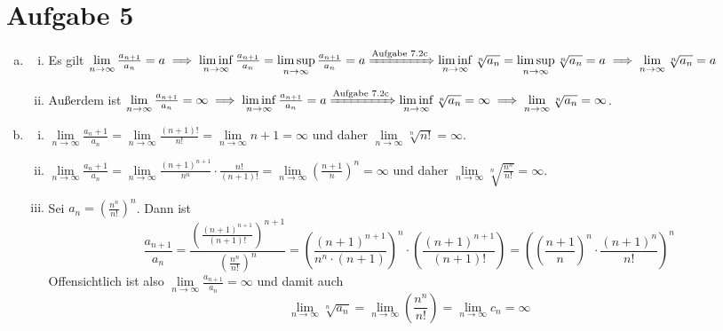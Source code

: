 \documentclass{article}
\begin{document}
    \section*{Aufgabe 5}
    \begin{enumerate}[(a)]
        \item \begin{enumerate}[(i)]
            \item Es gilt $\lim\limits_{n\to\infty}\frac{a_{n+1}}{a_n} = a \implies \liminf\limits_{n\to \infty}\frac{a_{n+1}}{a_n} = \limsup\limits_{n\to \infty} \frac{a_{n+1}}{a_n}= a \xRightarrow{\text{Aufgabe 7.2c}} \liminf\limits_{n\to \infty}\sqrt[n]{a_n} = \limsup\limits_{n\to \infty} \sqrt[n]{a_n} = a \implies \lim\limits_{n\to\infty}\sqrt[n]{a_n} = a$
            \item Außerdem ist $\lim\limits_{n\to\infty}\frac{a_{n+1}}{a_n} = \infty \implies \liminf\limits_{n\to \infty}\frac{a_{n+1}}{a_n} = a \xRightarrow{\text{Aufgabe 7.2c}} \liminf\limits_{n\to \infty}\sqrt[n]{a_n} = \infty \implies \lim\limits_{n\to\infty}\sqrt[n]{a_n} = \infty$.
        \end{enumerate}
        \item \begin{enumerate}[(i)]
            \item $\lim\limits_{n\to\infty}\frac{a_n+1}{a_n} =  \lim\limits_{n\to\infty}\frac{(n+1)!}{n!} = \lim\limits_{n\to\infty} n+1 = \infty$ und daher $\lim\limits_{n\to\infty} \sqrt[n]{n!} = \infty$.
            \item $\lim\limits_{n\to\infty}\frac{a_n+1}{a_n} = \lim\limits_{n\to\infty} \frac{(n+1)^{n+1}}{n^n} \cdot \frac{n!}{(n+1)!} = \lim\limits_{n\to\infty} \left(\frac{n+1}{n}\right)^n = \infty$ und daher $\lim\limits_{n\to\infty} \sqrt[n]{\frac{n^n}{n!}} = \infty$.
            \item Sei $a_n = \left(\frac{n^n}{n!}\right)^n$. Dann ist $$\frac{a_{n+1}}{a_n} = \frac{\left(\frac{(n+1)^{n+1}}{(n+1)!}\right)^{n+1}}{\left(\frac{n^n}{n!}\right)^n} = \left(\frac{(n+1)^{n+1}}{n^n\cdot (n+1)}\right)^n\cdot \left(\frac{(n+1)^{n+1}}{(n+1)!}\right) = \left(\left(\frac{n+1}{n}\right)^n\cdot \frac{(n+1)^n}{n!}\right)^n$$
            Offensichtlich ist also $\lim\limits_{n\to\infty} \frac{a_{n+1}}{a_n} = \infty$ und damit auch $$\lim\limits_{n\to\infty}\sqrt[n]{a_n} = \lim\limits_{n\to\infty} \left(\frac{n^n}{n!}\right) = \lim\limits_{n\to\infty} c_n = \infty$$
\begin{flushright}
	
\end{flushright}        \end{enumerate}
    \end{enumerate}
\end{document}
